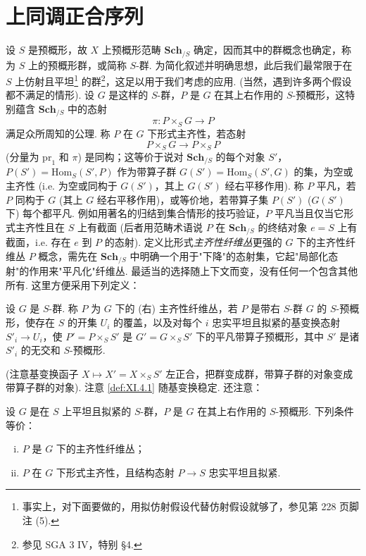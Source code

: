 \section{上同调正合序列}

设 $S$ 是预概形，故 $X$ 上预概形范畴 $\mathbf{Sch}_{/S}$ 确定，因而其中的群概念也确定，称为 $S$ 上的预概形群，或简称 $S$-群. 为简化叙述并明确思想，此后我们最常限于在 $S$ 上仿射且平坦\footnote{事实上，对下面要做的，用拟仿射假设代替仿射假设就够了，参见第 228 页脚注 (5).} 的群\footnote{参见 SGA 3 IV，特别 §4.}，这足以用于我们考虑的应用. (当然，遇到许多两个假设都不满足的情形). 设 $G$ 是这样的 $S$-群，$P$ 是 $G$ 在其上右作用的 $S$-预概形，这特别蕴含 $\mathbf{Sch}_{/S}$ 中的态射
\[
\pi \colon P \times_S G \longrightarrow P
\]
满足众所周知的公理. 称 $P$ 在 $G$ 下形式主齐性，若态射
\[
P \times_S G \longrightarrow P \times_S P
\]
(分量为 $\mathrm{pr}_1$ 和 $\pi$) 是同构；这等价于说对 $\mathbf{Sch}_{/S}$ 的每个对象 $S'$，$P(S') = \mathrm{Hom}_S(S', P)$ 作为带算子群 $G(S') = \mathrm{Hom}_S(S', G)$ 的集，为空或主齐性 (i.e. 为空或同构于 $G(S')$，其上 $G(S')$ 经右平移作用). 称 $P$ 平凡，若 $P$ 同构于 $G$ (其上 $G$ 经右平移作用)，或等价地，若带算子集 $P(S')$ ($G(S')$ 下) 每个都平凡. 例如用著名的归结到集合情形的技巧验证，$P$ 平凡当且仅当它形式主齐性且在 $S$ 上有截面 (后者用范畴术语说 $P$ 在 $\mathbf{Sch}_{/S}$ 的终结对象 $e = S$ 上有截面，i.e. 存在 $e$ 到 $P$ 的态射). 定义比形式\emph{主齐性纤维丛}更强的 $G$ 下的主齐性纤维丛 $P$ 概念，需先在 $\mathbf{Sch}_{/S}$ 中明确一个用于"下降"的态射集，它起"局部化态射"的作用来"平凡化"纤维丛. 最适当的选择随上下文而变，没有任何一个包含其他所有. 这里方便采用下列定义：

\begin{definition}\label{def:XI.4.1}
设 $G$ 是 $S$-群. 称 $P$ 为 $G$ 下的 (右) 主齐性纤维丛，若 $P$ 是带右 $S$-群 $G$ 的 $S$-预概形，使存在 $S$ 的开集 $U_i$ 的覆盖，以及对每个 $i$ 忠实平坦且拟紧的基变换态射 $S'_i \to U_i$，使 $P' = P \times_S S'$ 是 $G' = G \times_S S'$ 下的平凡带算子预概形，其中 $S'$ 是诸 $S'_i$ 的无交和 $S$-预概形.
\end{definition}

(注意基变换函子 $X \mapsto X' = X \times_S S'$ 左正合，把群变成群，带算子群的对象变成带算子群的对象). 注意 \ref{def:XI.4.1} 随基变换稳定. 还注意：

\begin{proposition}\label{prop:XI.4.2}
设 $G$ 是在 $S$ 上平坦且拟紧的 $S$-群，$P$ 是 $G$ 在其上右作用的 $S$-预概形. 下列条件等价：
\begin{enumerate}[i)]
\item $P$ 是 $G$ 下的主齐性纤维丛；
\item $P$ 在 $G$ 下形式主齐性，且结构态射 $P \to S$ 忠实平坦且拟紧.
\end{enumerate}
\end{proposition}

